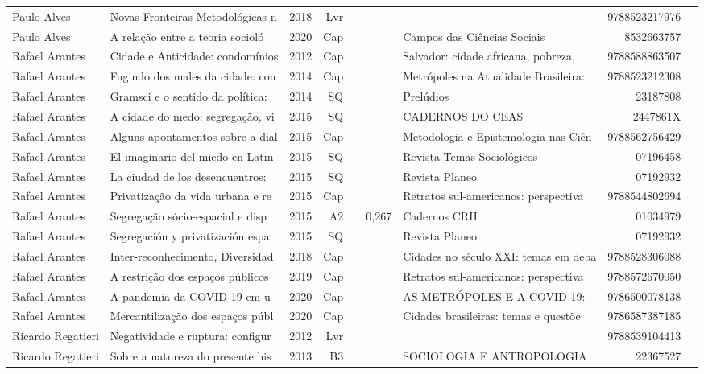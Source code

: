 \documentclass[12pt,brazil]{article}\usepackage[]{graphicx}\usepackage[]{xcolor}
\begin{document}
\begin{longtable}{lllrrllrr}
Paulo Alves & Novas Fronteiras Metodológicas n & 2018 & Lvr &  &  &  & 9788523217976 \\
Paulo Alves & A relação entre a teoria socioló & 2020 & Cap &  &  & Campos das Ciências Sociais & 8532663757 \\
Rafael Arantes & Cidade e Anticidade: condomínios & 2012 & Cap &  &  & Salvador: cidade africana, pobreza,  & 9788588863507 \\
Rafael Arantes & Fugindo dos males da cidade: con & 2014 & Cap &  &  & Metrópoles na Atualidade Brasileira: & 9788523212308 \\
Rafael Arantes & Gramsci e o sentido da política: & 2014 & SQ &  &  & Prelúdios & 23187808 \\
Rafael Arantes & A cidade do medo: segregação, vi & 2015 & SQ &  &  & CADERNOS DO CEAS & 2447861X \\
Rafael Arantes & Alguns apontamentos sobre a dial & 2015 & Cap &  &  & Metodologia e Epistemologia nas Ciên & 9788562756429 \\
Rafael Arantes & El imaginario del miedo en Latin & 2015 & SQ &  &  & Revista Temas Sociológicos & 07196458 \\
Rafael Arantes & La ciudad de los desencuentros:  & 2015 & SQ &  &  & Revista Planeo & 07192932 \\
Rafael Arantes & Privatização da vida urbana e re & 2015 & Cap &  &  & Retratos sul-americanos: perspectiva & 9788544802694 \\
Rafael Arantes & Segregação sócio-espacial e disp & 2015 & A2 &  & 0,267 & Cadernos CRH & 01034979 \\
Rafael Arantes & Segregación y privatización espa & 2015 & SQ &  &  & Revista Planeo & 07192932 \\
Rafael Arantes & Inter-reconhecimento, Diversidad & 2018 & Cap &  &  & Cidades no século XXI: temas em deba & 9788528306088 \\
Rafael Arantes & A restrição dos espaços públicos & 2019 & Cap &  &  & Retratos sul-americanos: perspectiva & 9788572670050 \\
Rafael Arantes & A pandemia da COVID-19 em u & 2020 & Cap &  &  & AS METRÓPOLES E A COVID-19: & 9786500078138 \\
Rafael Arantes & Mercantilização dos espaços públ & 2020 & Cap &  &  & Cidades brasileiras: temas e questõe & 9786587387185 \\
Ricardo Regatieri & Negatividade e ruptura: configur & 2012 & Lvr &  &  &  & 9788539104413 \\
Ricardo Regatieri & Sobre a natureza do presente his & 2013 & B3 &  &  & SOCIOLOGIA E ANTROPOLOGIA & 22367527 \\

\end{longtable}
\end{document}
